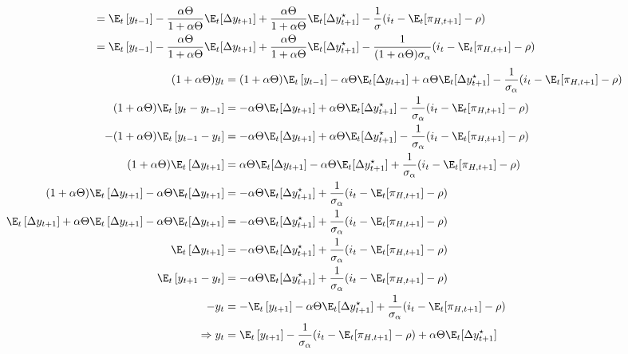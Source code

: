 \begin{landscape}
\begin{align*}
    &= \E_t\left[y_{t-1}\right] - \frac{\alpha \Theta}{1+\alpha \Theta} \E_t[\Delta y_{t+1}] + \frac{\alpha \Theta}{1+\alpha \Theta}\E_t[\Delta y_{t+1}^{\star}] - \frac{1}{\sigma}( i_t  - \E_t [\pi_{H,t+1}] - \rho  ) \\
    &= \E_t\left[y_{t-1}\right] - \frac{\alpha \Theta}{1+\alpha \Theta} \E_t[\Delta y_{t+1}] + \frac{\alpha \Theta}{1+\alpha \Theta}\E_t[\Delta y_{t+1}^{\star}] - \frac{1}{(1+\alpha \Theta)\sigma_\alpha}( i_t  - \E_t [\pi_{H,t+1}] - \rho  ) \\
\end{align*}  
\begin{align}  
    (1+\alpha \Theta)y_t&= (1+\alpha \Theta)\E_t\left[y_{t-1}\right] - \alpha \Theta \E_t[\Delta y_{t+1}] + \alpha \Theta\E_t[\Delta y_{t+1}^{\star}] - \frac{1}{\sigma_\alpha}( i_t  - \E_t [\pi_{H,t+1}] - \rho  ) \nonumber\\
    (1+\alpha \Theta)\E_t\left[y_t - y_{t-1}\right]&=  - \alpha \Theta \E_t[\Delta y_{t+1}] + \alpha \Theta\E_t[\Delta y_{t+1}^{\star}] - \frac{1}{\sigma_\alpha}( i_t  - \E_t [\pi_{H,t+1}] - \rho  ) \nonumber\\
    -(1+\alpha \Theta)\E_t\left[y_{t-1} - y_t \right]&=  - \alpha \Theta \E_t[\Delta y_{t+1}] + \alpha \Theta\E_t[\Delta y_{t+1}^{\star}] - \frac{1}{\sigma_\alpha}( i_t  - \E_t [\pi_{H,t+1}] - \rho  ) \nonumber\\
    (1+\alpha \Theta)\E_t\left[\Delta y_{t+1}\right]&=  \alpha \Theta \E_t[\Delta y_{t+1}] - \alpha \Theta\E_t[\Delta y_{t+1}^{\star}] + \frac{1}{\sigma_\alpha}( i_t  - \E_t [\pi_{H,t+1}] - \rho  ) \nonumber\\
    (1+\alpha \Theta)\E_t\left[\Delta y_{t+1}\right] - \alpha \Theta \E_t[\Delta y_{t+1}]&= - \alpha \Theta\E_t[\Delta y_{t+1}^{\star}] + \frac{1}{\sigma_\alpha}( i_t  - \E_t [\pi_{H,t+1}] - \rho  ) \nonumber\\
    \E_t\left[\Delta y_{t+1}\right] +\alpha \Theta\E_t\left[\Delta y_{t+1}\right] - \alpha \Theta \E_t[\Delta y_{t+1}]&= - \alpha \Theta\E_t[\Delta y_{t+1}^{\star}] + \frac{1}{\sigma_\alpha}( i_t  - \E_t [\pi_{H,t+1}] - \rho  ) \nonumber\\
    \E_t\left[\Delta y_{t+1}\right] &= - \alpha \Theta\E_t[\Delta y_{t+1}^{\star}] + \frac{1}{\sigma_\alpha}( i_t  - \E_t [\pi_{H,t+1}] - \rho  ) \nonumber\\
    \E_t\left[y_{t+1}-y_t\right] &= - \alpha \Theta\E_t[\Delta y_{t+1}^{\star}] + \frac{1}{\sigma_\alpha}( i_t  - \E_t [\pi_{H,t+1}] - \rho  )\nonumber\\
    -y_t &= -\E_t\left[y_{t+1}\right]- \alpha \Theta\E_t[\Delta y_{t+1}^{\star}] + \frac{1}{\sigma_\alpha}( i_t  - \E_t [\pi_{H,t+1}] - \rho  ) \nonumber\\
    \Rightarrow y_t &= \E_t\left[y_{t+1}\right]- \frac{1}{\sigma_\alpha}( i_t  - \E_t [\pi_{H,t+1}] - \rho  ) + \alpha \Theta\E_t[\Delta y_{t+1}^{\star}] \\
\end{align}
\end{landscape}
